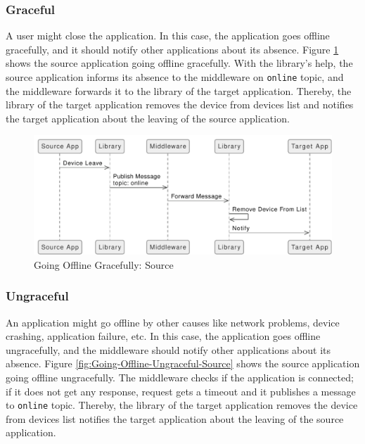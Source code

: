 \subsubsection{Graceful}
A user might close the application. In this case, the application goes offline gracefully, and it should notify other applications about its absence. Figure \ref{fig:Going-Offline-Graceful-Source} shows the source application going offline gracefully. With the library's help, the source application informs its absence to the middleware on \lstinline[basicstyle=\ttfamily]{online} topic, and the middleware forwards it to the library of the target application. Thereby, the library of the target application removes the device from devices list and notifies the target application about the leaving of the source application. 

\FloatBarrier \begin{figure}[H]
    \includegraphics[width=\linewidth]{../figures/Going-Offline-Graceful-Source.pdf}
    \centering
    \caption{Going Offline Gracefully: Source}
    \label{fig:Going-Offline-Graceful-Source}
\end{figure} \FloatBarrier

\subsubsection{Ungraceful}
An application might go offline by other causes like network problems, device crashing, application failure, etc. In this case, the application goes offline ungracefully, and the middleware should notify other applications about its absence. Figure \ref{fig:Going-Offline-Ungraceful-Source} shows the source application going offline ungracefully. The middleware checks if the application is connected; if it does not get any response, request gets a timeout and it publishes a message to  \lstinline[basicstyle=\ttfamily]{online} topic. Thereby, the library of the target application removes the device from devices list notifies the target application about the leaving of the source application.

